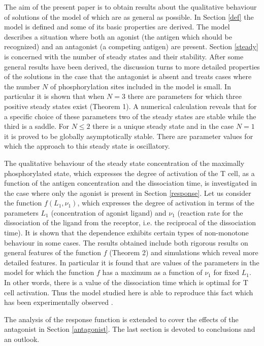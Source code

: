 \documentclass{article}
\begin{document}
The aim of the present paper is to obtain results about the qualitative 
behaviour of solutions of the model of \cite{francois13} which are as 
general as possible. In Section \ref{def} the model is defined and some
of its basic properties are derived. The model describes a situation where
both an agonist (the antigen which should be recognized) and an 
antagonist (a competing antigen) are present. Section \ref{steady} is concerned 
with the number of steady states and their stability. After some general 
results have been derived, the discussion turns to more detailed properties
of the solutions in the case that the antagonist is absent and treats cases 
where the number $N$ of phosphorylation sites included in the model is small. 
In particular it is shown that when $N=3$ there are parameters for which 
three positive steady states exist (Theorem 1). A numerical calculation 
reveals that for a specific choice of these parameters two of the steady 
states are stable while the third is a saddle. For $N\le 2$ there is a unique
steady state and in the case $N=1$ it is proved to be globally asymptotically
stable. There are parameter values for which the approach to this steady state
is oscillatory.

The qualitative behaviour of the steady state concentration of the maximally 
phosphorylated state, which expresses the degree of activation of the T cell, 
as a function of the antigen concentration and the dissociation time, is 
investigated in the case where only the agonist is present in Section 
\ref{response}. Let us consider the function $f(L_1,\nu_1)$, which expresses
the degree of activation in terms of the parameters $L_1$ (concentration
of agonist ligand) and $\nu_1$ (reaction rate for the dissociation of the 
ligand from the receptor, i.e. the reciprocal of the dissociation time).
It is shown that the dependence exhibits certain types of non-monotone
behaviour in some cases. The results obtained include both rigorous results
on general features of the function $f$ (Theorem 2) and simulations which 
reveal more detailed features. In particular it is found that are values of the 
parameters in the model for which the function $f$ has a maximum as a function
of $\nu_1$ for fixed $L_1$. In other words, there is a value of the 
dissociation time which is optimal for T cell activation. Thus the model
studied here is able to reproduce this fact which has been experimentally 
observed \cite{lever16}.

The analysis of the response function is extended to cover the effects of the 
antagonist in Section \ref{antagonist}. The last section is devoted to 
conclusions and an outlook. 
\end{document}
